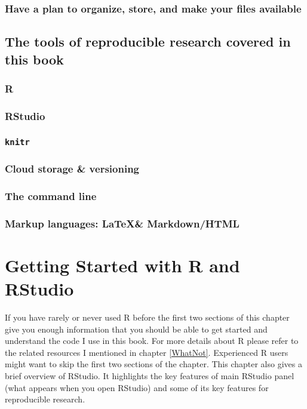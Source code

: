 \documentclass[ChapterTOCs,krantz1]{krantz}\usepackage{graphicx, color}
\begin{document}
\subsection{Have a plan to organize, store, and make your files
available}

\section{The tools of reproducible research covered in this book}

\subsection{R}

\subsection{RStudio}

\subsection{\texttt{knitr}}

\subsection{Cloud storage \& versioning}

\subsection{The command line}

\subsection{Markup languages: \LaTeX \& Markdown/HTML}





\chapter{Getting Started with R and RStudio}

If you have rarely or never used R before the first two sections of this chapter give you enough information that you should be able to get started and understand the code I use in this book. For more details about R please refer to the related resources I mentioned in chapter \ref{WhatNot}. Experienced R users might want to skip the first two sections of the chapter. This chapter also gives a brief overview of RStudio. It highlights the key features of main RStudio panel (what appears when you open RStudio) and some of its key features for reproducible research.
\end{document}
